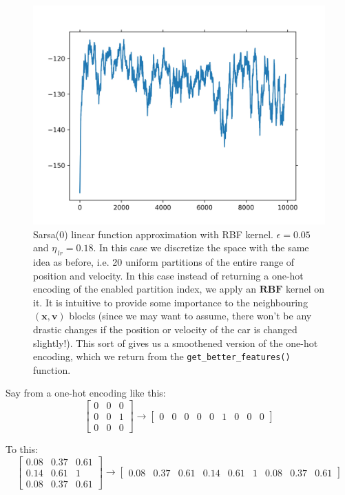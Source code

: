 \documentclass[11pt]{article}
\begin{document}
    \begin{figure}[htbp!]
        \centering
        \includegraphics[width=0.7\linewidth]{T2.jpg}
        \caption{
            Sarsa(0) linear function approximation with RBF kernel. $\epsilon=0.05$ and $\eta_{\,lr}=0.18$. In this case we discretize the space with the same idea as before, i.e. 20 uniform partitions of the entire range of position and velocity. In this case instead of returning a one-hot encoding of the enabled partition index, we apply an $\mathbf{RBF}$ kernel on it. It is intuitive to provide some importance to the neighbouring $\mathbf{(x,v)}$ blocks (since we may want to assume, there won't be any drastic changes if the position or velocity of the car is changed slightly!). This sort of gives us a smoothened version of the one-hot encoding, which we return from the \texttt{get_better_features()} function.}
    \end{figure}%
    Say from a one-hot encoding like this:
    \begin{equation*}
        \begin{bmatrix}
            0 & 0 & 0 \\
            0 & 0 & 1 \\
            0 & 0 & 0
        \end{bmatrix}
        \longrightarrow
        \begin{bmatrix}
            0 & 0 & 0 & 0 & 0 & 1 & 0 & 0 & 0
        \end{bmatrix}
    \end{equation*}

    To this:
    \begin{equation*}
        \begin{bmatrix}
            0.08 & 0.37 & 0.61 \\
            0.14 & 0.61 & 1    \\
            0.08 & 0.37 & 0.61
        \end{bmatrix}
        \longrightarrow
        \begin{bmatrix}
            0.08 & 0.37 & 0.61 & 0.14 & 0.61 & 1 & 0.08 & 0.37 & 0.61
        \end{bmatrix}
    \end{equation*}
    
\end{document}

